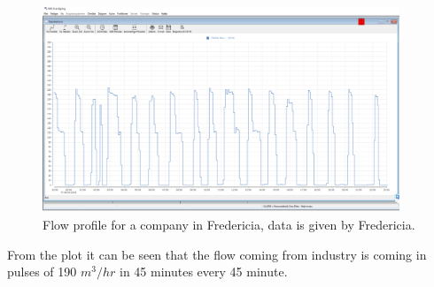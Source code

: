 \begin{figure}[H]
	\centering
	\includegraphics[width=0.95\textwidth]{report/system_overview/pictures/flow_profile_industry}
	\caption{Flow profile for a company in Fredericia, data is given by Fredericia.}
	\label{fig:flow_profile_industry}
\end{figure}			
From the plot it can be seen that the flow coming from industry is coming in pulses of 190 $m^3/hr$ in 45 minutes every 45 minute.  

